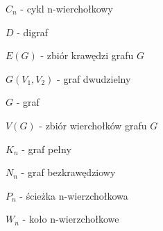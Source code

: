 $C_n$ - cykl n-wierchołkowy

$D$ - digraf

$E(G)$ - zbiór krawędzi grafu $G$

$G(V_1, V_2)$ - graf dwudzielny

$G$ - graf

$V(G)$ - zbiór wierchołków grafu $G$

$K_n$ - graf pełny

$N_n$ - graf bezkrawędziowy

$P_n$ - ścieżka n-wierzchołkowa

$W_n$ - koło n-wierzchołkowe